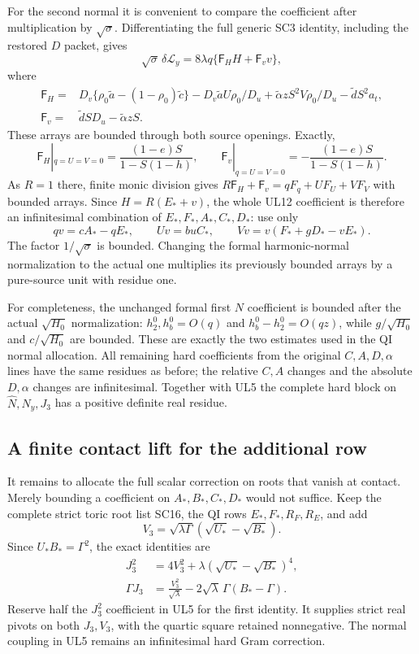 For the second normal it is convenient to compare the coefficient
after multiplication by $\sqrt\sigma$. Differentiating the full
generic SC3 identity, including the restored $D$ packet, gives
\[
 \sqrt\sigma\,\delta\mathcal L_y
       =8\lambda q\{\mathsf F_HH+\mathsf F_vv\},                 \tag{UL12}
\]
where
\[
\begin{split}
\mathsf F_H={}&D_v\{\rho_0\widetilde a
                    -(1-\rho_0)\widetilde c\}
 -D_v\widetilde aU\rho_0/D_u
 +\widetilde\alpha zS^2V\rho_0/D_u
 -\widetilde dS^2a_t,\\
\mathsf F_v={}&\widetilde dSD_u-\widetilde\alpha zS.
\end{split}
\]
These arrays are bounded through both source openings. Exactly,
\[
 \mathsf F_H|_{q=U=V=0}
       =\frac{(1-e)S}{1-S(1-h)},\qquad
 \mathsf F_v|_{q=U=V=0}
       =-\frac{(1-e)S}{1-S(1-h)}.                              \tag{UL13}
\]
As $R=1$ there, finite monic division gives
$R\mathsf F_H+\mathsf F_v=qF_q+UF_U+VF_V$ with bounded
arrays. Since $H=R(E_*+v)$, the whole UL12 coefficient is
therefore an infinitesimal combination of $E_*,F_*,A_*,C_*,D_*$:
use only
\[
 qv=cA_*-qE_*,\qquad Uv=buC_*,\qquad
 Vv=v(F_*+gD_*-vE_*).                                         \tag{UL14}
\]
The factor $1/\sqrt\sigma$ is bounded.
Changing the formal harmonic-normal normalization to the actual
one multiplies its previously bounded arrays by a pure-source
unit with residue one.

For completeness, the unchanged formal first $N$ coefficient is
bounded after the actual $\sqrt{H_0}$ normalization:
$h_2^0,h_b^0=O(q)$ and $h_b^0-h_2^0=O(qz)$, while
$g/\sqrt{H_0}$ and $c/\sqrt{H_0}$ are bounded. These are exactly
the two estimates used in the QI normal allocation.
All remaining hard coefficients from the original $C,A,D,\alpha$
lines have the same residues as before; the relative $C,A$
changes and the absolute $D,\alpha$ changes are infinitesimal.
Together with UL5 the complete hard block on
$\widehat N,N_y,J_3$ has a positive definite real residue.

\subsection{A finite contact lift for the additional row}

It remains to allocate the full scalar correction on roots that
vanish at contact. Merely bounding a coefficient on $A_*,B_*,C_*,D_*$
would not suffice. Keep the complete strict toric root list SC16,
the QI rows $E_*,F_*,R_F,R_E$, and add
\[
 V_3=\sqrt{\lambda\Gamma}(\sqrt{U_*}-\sqrt{B_*}).
\]
Since $U_*B_*=\Gamma^2$, the exact identities are
\[
\begin{split}
 J_3^2&=4V_3^2+\lambda(\sqrt{U_*}-\sqrt{B_*})^4,\\
 \Gamma J_3&=\frac{V_3^2}{\sqrt\lambda}
                      -2\sqrt\lambda\,\Gamma(B_*-\Gamma).
\end{split}                                                     \tag{UL15}
\]
Reserve half the $J_3^2$ coefficient in UL5 for the first
identity. It supplies strict real pivots on both $J_3,V_3$,
with the quartic square retained nonnegative. The normal
coupling in UL5 remains an infinitesimal hard Gram correction.

